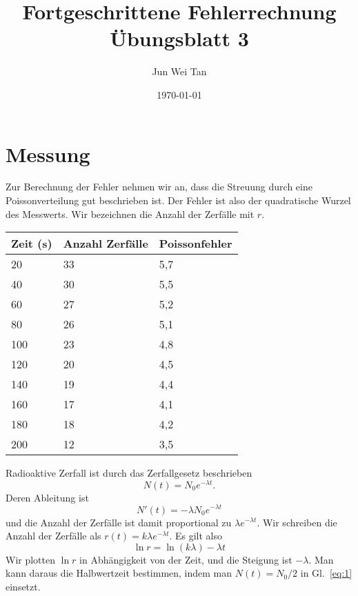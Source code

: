 \documentclass[prb,12pt]{revtex4-2}
\theoremstyle{definition}
\theoremstyle{definition}
\begin{document}
\title{Fortgeschrittene Fehlerrechnung Übungsblatt 3}
	\author{Jun Wei Tan}
	\date{\today}
	\maketitle

\section{Messung}
Zur Berechnung der Fehler nehmen wir an, dass die Streuung durch eine Poissonverteilung gut beschrieben ist. Der Fehler ist also der quadratische Wurzel des Messwerts. Wir bezeichnen die Anzahl der Zerfälle mit $r$.
\begin{center}
	\begin{tabular}{p{3cm}p{3cm}p{3cm}}
		\toprule
		\textbf{Zeit (s)} & \textbf{Anzahl Zerfälle} & \textbf{Poissonfehler} \\\midrule
	20 & 33 & 5,7 \\\midrule
40 & 30 & 5,5 \\\midrule
60 & 27 & 5,2 \\\midrule
80 & 26 & 5,1 \\\midrule
100 & 23 & 4,8 \\\midrule
120 & 20 & 4,5 \\\midrule
140 & 19 & 4,4 \\\midrule
160 & 17 & 4,1 \\\midrule
180 & 18 & 4,2 \\\midrule
200 & 12 & 3,5 \\\bottomrule
	\end{tabular}
\end{center}
Radioaktive Zerfall ist durch das Zerfallgesetz beschrieben
\begin{equation}\label{eq:1}
	N(t)=N_0e^{-\lambda t}.
\end{equation}
Deren Ableitung ist
\[N'(t)=-\lambda N_0e^{-\lambda t}\]
und die Anzahl der Zerfälle ist damit proportional zu $\lambda e^{-\lambda t}$. Wir schreiben die Anzahl der Zerfälle als $r(t)=k\lambda e^{-\lambda t}$. Es gilt also
\begin{equation}\label{eq:2}
\ln r = \ln (k\lambda) -\lambda t
\end{equation}
Wir plotten $\ln r$ in Abhängigkeit von der Zeit, und die Steigung ist $-\lambda$. Man kann daraus die Halbwertzeit bestimmen, indem man $N(t) = N_0/2$ in Gl.~\eqref{eq:1} einsetzt.
\end{document}
